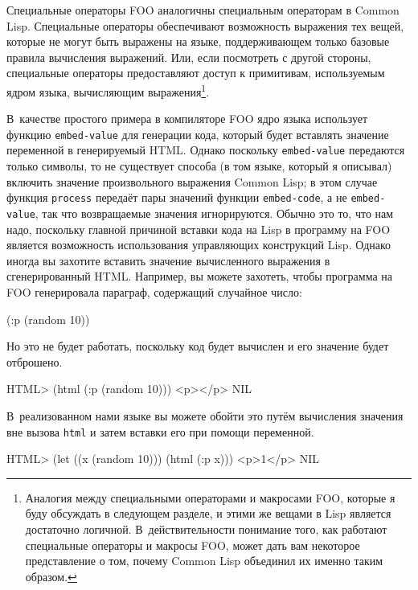 Специальные операторы FOO аналогичны специальным операторам в Common Lisp. Специальные
операторы обеспечивают возможность выражения тех вещей, которые не могут быть выражены на
языке, поддерживающем только базовые правила вычисления выражений.  Или, если посмотреть с
другой стороны, специальные операторы предоставляют доступ к примитивам, используемым
ядром языка, вычисляющим выражения\footnote{Аналогия между специальными операторами и
  макросами FOO, которые я буду обсуждать в следующем разделе, и этими же вещами в Lisp
  является достаточно логичной.  В~действительности понимание того, как работают
  специальные операторы и макросы FOO, может дать вам некоторое представление о том,
  почему Common Lisp объединил их именно таким образом.}.

В~качестве простого примера в компиляторе FOO ядро языка использует функцию
\lstinline{embed-value} для генерации кода, который будет вставлять значение переменной в
генерируемый HTML.  Однако поскольку \lstinline{embed-value} передаются только символы, то не
существует способа (в том языке, который я описывал) включить значение произвольного
выражения Common Lisp; в этом случае функция \lstinline{process} передаёт пары значений функции
\lstinline{embed-code}, а не \lstinline{embed-value}, так что возвращаемые значения игнорируются.
Обычно это то, что нам надо, поскольку главной причиной вставки кода на Lisp в программу
на FOO является возможность использования управляющих конструкций Lisp.  Однако иногда
вы захотите вставить значение вычисленного выражения в сгенерированный HTML.  Например, вы
можете захотеть, чтобы программа на FOO генерировала параграф, содержащий случайное число:

\begin{myverb}
(:p (random 10))
\end{myverb}

Но это не будет работать, поскольку код будет вычислен и его значение будет отброшено.

\begin{myverb}
HTML> (html (:p (random 10)))
<p></p>
NIL
\end{myverb}

В~реализованном нами языке вы можете обойти это путём вычисления значения вне вызова
\lstinline{html} и затем вставки его при помощи переменной.

\begin{myverb}
HTML> (let ((x (random 10))) (html (:p x)))
<p>1</p>
NIL
\end{myverb}


